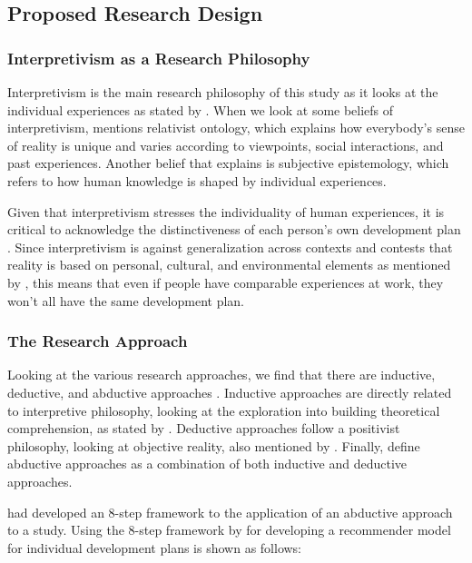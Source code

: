\subsection{Proposed Research Design}
\subsubsection{Interpretivism as a Research Philosophy}

Interpretivism is the main research philosophy of this study as it looks at the individual experiences as stated by \cite{irshaidat2019interpretivism}. When we look at some beliefs of interpretivism, \cite{Saunders2012} mentions relativist ontology, which explains how everybody's sense of reality is unique and varies according to viewpoints, social interactions, and past experiences. Another belief that \cite{Saunders2012} explains is subjective epistemology, which refers to how human knowledge is shaped by individual experiences.

Given that interpretivism stresses the individuality of human experiences, it is critical to acknowledge the distinctiveness of each person's own development plan \cite{Saunders2012}. Since interpretivism is against generalization across contexts and contests that reality is based on personal, cultural, and environmental elements as mentioned by \cite{myers2008qualitative}, this means that even if people have comparable experiences at work, they won't all have the same development plan.

\subsubsection{The Research Approach}

Looking at the various research approaches, we find that there are inductive, deductive, and abductive approaches \cite{mantere2013reasoning}. Inductive approaches are directly related to interpretive philosophy, looking at the exploration into building theoretical comprehension, as stated by \cite{hurley2021integrating}. Deductive approaches follow a positivist philosophy, looking at objective reality, also mentioned by \cite{hurley2021integrating}. Finally, \cite{tavory2014abductive} define abductive approaches as a combination of both inductive and deductive approaches.

\cite{thompson2022guide} had developed an 8-step framework to the application of an abductive approach to a study. Using the 8-step framework by \cite{thompson2022guide} for developing a recommender model for individual development plans is shown as follows:

